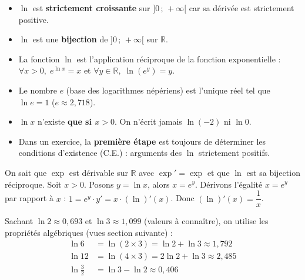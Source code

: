 \documentclass[11pt]{article}
\begin{document}
\begin{aretenir}
\begin{itemize}
\item $\ln$ est \textbf{strictement croissante} sur $]0\,;\,+\infty[$ car sa dérivée est strictement positive.
\item $\ln$ est une \textbf{bijection} de $]0\,;\,+\infty[$ sur $\mathbb{R}$.
\item La fonction $\ln$ est l'application réciproque de la fonction exponentielle : $\forall x>0,\; e^{\ln x}=x$ et $\forall y\in\mathbb{R},\; \ln(e^y)=y$.
\item Le nombre $e$ (base des logarithmes népériens) est l'unique réel tel que $\ln e = 1$ ($e\approx 2,718$).
\end{itemize}
\end{aretenir}

\begin{attention}
\begin{itemize}
\item $\ln x$ n'existe \textbf{que si $x>0$}. On n'écrit jamais $\ln(-2)$ ni $\ln 0$.
\item Dans un exercice, la \textbf{première étape} est toujours de déterminer les conditions d'existence (C.E.) : arguments des $\ln$ strictement positifs.
\end{itemize}
\end{attention}

\begin{experience}
On sait que $\exp$ est dérivable sur $\mathbb{R}$ avec $\exp'=\exp$ et que $\ln$ est sa bijection réciproque.
Soit $x>0$. Posons $y=\ln x$, alors $x=e^y$.
Dérivons l'égalité $x=e^y$ par rapport à $x$ : $1 = e^y \cdot y' = x \cdot (\ln)'(x)$.
Donc $(\ln)'(x) = \dfrac{1}{x}$.
\end{experience}

\begin{exemplebox}
Sachant $\ln 2 \approx 0,693$ et $\ln 3 \approx 1,099$ (valeurs à connaître), on utilise les propriétés algébriques (vues section suivante) :
\begin{align*}
\ln 6 &= \ln(2\times 3) = \ln 2 + \ln 3 \approx 1,792 \\
\ln 12 &= \ln(4\times 3) = 2\ln 2 + \ln 3 \approx 2,485 \\
\ln \frac{3}{2} &= \ln 3 - \ln 2 \approx 0,406
\end{align*}
\end{exemplebox}
\end{document}
